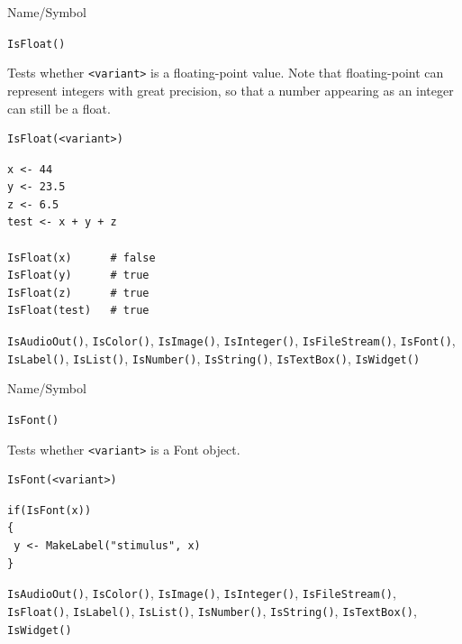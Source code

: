\begin{desc}{Name/Symbol}
\item[Name/Symbol]	\verb+IsFloat()+

\item[Description] Tests whether \verb+<variant>+ is a floating-point
  value. Note that floating-point can represent integers with great
  precision, so that a number appearing as an integer can still be a
  float.

\item[Usage]
\begin{verbatim}
IsFloat(<variant>)
\end{verbatim}

\item[Example]
\begin{verbatim}
x <- 44
y <- 23.5
z <- 6.5
test <- x + y + z 

IsFloat(x)     	# false
IsFloat(y)     	# true
IsFloat(z)     	# true
IsFloat(test)  	# true
\end{verbatim}

\item[See Also] \verb+IsAudioOut()+, \verb+IsColor()+,
  \verb+IsImage()+, \verb+IsInteger()+, \verb+IsFileStream()+,
  \verb+IsFont()+, \verb+IsLabel()+, \verb+IsList()+,
  \verb+IsNumber()+, \verb+IsString()+, \verb+IsTextBox()+,
  \verb+IsWidget()+
\end{desc}



\begin{desc}{Name/Symbol}
\item[Name/Symbol]	\verb+IsFont()+

\item[Description]	Tests whether \verb+<variant>+ is a Font object.

\item[Usage]
\begin{verbatim}
IsFont(<variant>)
\end{verbatim}

\item[Example]	
\begin{verbatim}
if(IsFont(x))
{
 y <- MakeLabel("stimulus", x)
}
\end{verbatim}

\item[See Also] \verb+IsAudioOut()+, \verb+IsColor()+,
  \verb+IsImage()+, \verb+IsInteger()+, \verb+IsFileStream()+,
  \verb+IsFloat()+, \verb+IsLabel()+, \verb+IsList()+,
  \verb+IsNumber()+, \verb+IsString()+, \verb+IsTextBox()+,
  \verb+IsWidget()+
\end{desc}



